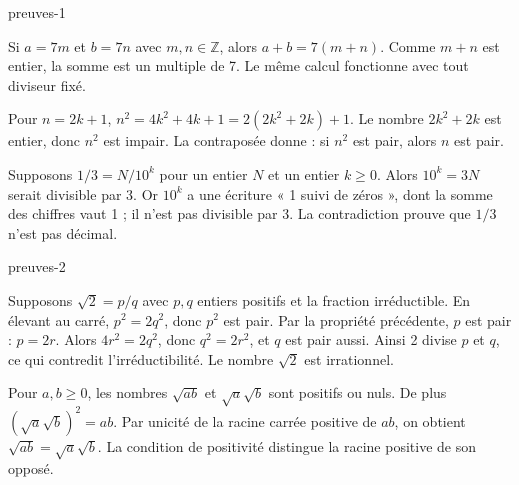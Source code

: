 \clearpage{}\label{preuves-debut}
\begin{blocEdition}{preuves-1}
\begin{demonstration}
Si $a=7m$ et $b=7n$ avec $m,n\in\mathbb Z$, alors $a+b=7(m+n)$. Comme $m+n$ est entier, la somme est un multiple de 7. Le même calcul fonctionne avec tout diviseur fixé.
\end{demonstration}
\begin{demonstration}
Pour $n=2k+1$, $n^2=4k^2+4k+1=2(2k^2+2k)+1$. Le nombre $2k^2+2k$ est entier, donc $n^2$ est impair. La contraposée donne : si $n^2$ est pair, alors $n$ est pair.
\end{demonstration}
\begin{demonstration}
Supposons $1/3=N/10^k$ pour un entier $N$ et un entier $k\ge0$. Alors $10^k=3N$ serait divisible par 3. Or $10^k$ a une écriture « 1 suivi de zéros », dont la somme des chiffres vaut 1 ; il n’est pas divisible par 3. La contradiction prouve que $1/3$ n’est pas décimal.
\end{demonstration}

\end{blocEdition}
\begin{blocEdition}{preuves-2}
\begin{demonstration}
Supposons $\sqrt2=p/q$ avec $p,q$ entiers positifs et la fraction irréductible. En élevant au carré, $p^2=2q^2$, donc $p^2$ est pair. Par la propriété précédente, $p$ est pair : $p=2r$. Alors $4r^2=2q^2$, donc $q^2=2r^2$, et $q$ est pair aussi. Ainsi 2 divise $p$ et $q$, ce qui contredit l’irréductibilité. Le nombre $\sqrt2$ est irrationnel.
\end{demonstration}
\begin{demonstration}
Pour $a,b\ge0$, les nombres $\sqrt{ab}$ et $\sqrt a\sqrt b$ sont positifs ou nuls. De plus $(\sqrt a\sqrt b)^2=ab$. Par unicité de la racine carrée positive de $ab$, on obtient $\sqrt{ab}=\sqrt a\sqrt b$. La condition de positivité distingue la racine positive de son opposé.
\end{demonstration}

\end{blocEdition}
